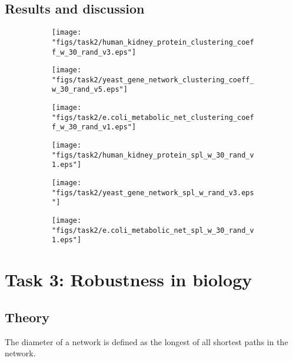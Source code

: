 \documentclass{article}
\begin{document}
\subsection{Results and discussion}

\begin{figure}[H]
	\centering
	\begin{subfigure}[b]{.3\textwidth}
		\centering
		\texttt{[image: "figs/task2/human\_kidney\_protein\_clustering\_coeff\_w\_30\_rand\_v3.eps"]}
		\caption{}
		\label{fig:task2_clust_hkp}
	\end{subfigure}
	\begin{subfigure}[b]{.3\textwidth}
		\centering
		\texttt{[image: "figs/task2/yeast\_gene\_network\_clustering\_coeff\_w\_30\_rand\_v5.eps"]}
		\caption{}
		\label{fig:task2_clust_yeast}
	\end{subfigure}
	\begin{subfigure}[b]{.3\textwidth}
		\centering
		\texttt{[image: "figs/task2/e.coli\_metabolic\_net\_clustering\_coeff\_w\_30\_rand\_v1.eps"]}
		\caption{}
		\label{fig:task2_clust_ecoli}
	\end{subfigure}
	\begin{subfigure}[b]{.3\textwidth}
		\centering
		\texttt{[image: "figs/task2/human\_kidney\_protein\_spl\_w\_30\_rand\_v1.eps"]}
		\caption{}
		\label{fig:task2_spl_hkp}
	\end{subfigure}
	\begin{subfigure}[b]{.3\textwidth}
		\centering
		\texttt{[image: "figs/task2/yeast\_gene\_network\_spl\_w\_rand\_v3.eps"]}
		\caption{}
		\label{fig:task2_spl_yeast}
	\end{subfigure}
	\begin{subfigure}[b]{.3\textwidth}
		\centering
		\texttt{[image: "figs/task2/e.coli\_metabolic\_net\_spl\_w\_30\_rand\_v1.eps"]}
		\caption{}
		\label{fig:task2_spl_ecoli}
	\end{subfigure}
\end{figure}



\section{Task 3: Robustness in biology}
\subsection{Theory}
The diameter of a network is defined as the longest of all shortest paths in the network. 
\end{document}
